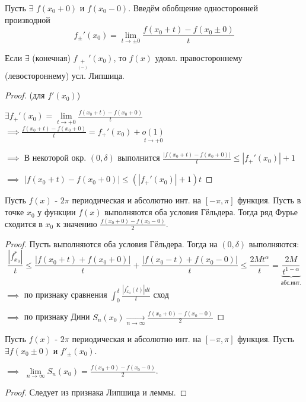 \documentclass{article}
\begin{document}
\begin{definition}
  Пусть $\exists$ $f(x_0+0)$ и $f(x_0-0)$. Введём обобщение односторонней производной
  \[
    f_{\pm}'(x_0)=\lim\limits_{t\to \pm 0} \frac{f(x_0+t)-f(x_0\pm0)}{t}
  \]
\end{definition}
\begin{lemma}
  Если $\exists$ (конечная) $f_{\underset{(-)}{+}}'(x_0)$, то $f(x)$ удовл.
  правостороннему (левостороннему) усл. Липшица.
\end{lemma}
\begin{proof}
  (для $f'(x_0)$)

  $\exists f_{+}'(x_0)=\lim\limits_{t\to+0}\frac{f(x_0+t)-f(x_0+0)}{t}$
  $\implies \frac{f(x_0+t)-f(x_0+0)}{t}=f_{+}'(x_0)+\underset{t\to +0}{o(1)}$

  $\implies$ В некоторой окр. $(0,\delta)$ выполнится
  $\frac{|f(x_0+t)-f(x_0+0)|}{t}\le |f_{+}'(x_{0})|+1$

  $\implies$ $|f(x_{0}+t)-f(x_{0}+0)|\le (|f_{+}'(x_{0})|+1)t$
\end{proof}
\begin{theorem}
  Пусть $f(x)$ - $2\pi$ периодическая и абсолютно инт. на $[-\pi,\pi]$ функция.
  Пусть  в точке $x_0$ у функции $f(x)$ выполняются оба условия Гёльдера.
  Тогда ряд Фурье сходится в $x_{0}$ к значению $\frac{f(x_{0}+0)-f(x_{0}-0)}{2}$.
\end{theorem}
\begin{proof}
  Пусть выполняются оба условия Гёльдера.
  Тогда на $(0,\delta)$ выполняются:
  \[
    \frac{|f^{*}_{x_{0}}|}{t}\le \frac{|f(x_0+t)+f(x_0+0)|}{t}+\frac{|f(x_0-t)+f(x_0-0)|}{t}
    \le \frac{2Mt^{\alpha}}{t}=\underbrace{\frac{2M}{t^{1-\alpha}}}_{\text{абс.инт.}}
  \]
  $\implies$ по признаку сравнения $\int_{0}^{\delta}\frac{|f_{x_{0}}^{*}(t)|dt}{t}$ сход

  $\implies$ по признаку Дини  $S_n(x_{0})\underset{n\to\infty}{\to}\frac{f(x_{0}+0)-f(x_{0}-0)}{2}$
\end{proof}
\begin{corollary}
  Пусть $f(x)$ - $2\pi$ периодическая и абсолютно инт. на $[-\pi,\pi]$ функция.
  Пусть $\exists f(x_{0}\pm 0)$ и $f'_{\pm}(x_{0})$.

  $\implies$ $\lim\limits_{n\to \infty}S_n(x_{0})=\frac{f(x_{0}+0)-f(x_{0}-0)}{2}$.
\end{corollary}
\begin{proof}
  Следует из признака Липшица и леммы.
\end{proof}
\end{document}
